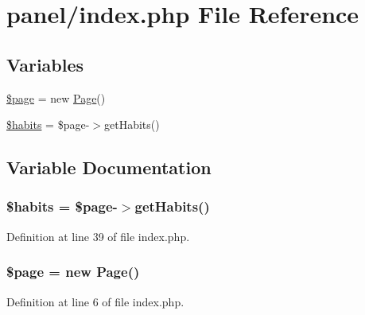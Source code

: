 \hypertarget{panel_2index_8php}{}\section{panel/index.php File Reference}
\label{panel_2index_8php}
\subsection*{Variables}
\begin{DoxyCompactItemize}
\item 
\hyperlink{panel_2index_8php_a0a44e6760141442bb439b1ab1395d8ff}{\$page} = new \hyperlink{class_page}{Page}()
\item 
\hyperlink{panel_2index_8php_adb07f6e649a22461013fd4e2b45feee9}{\$habits} = \$page-\/$>$get\+Habits()
\end{DoxyCompactItemize}


\subsection{Variable Documentation}
\hypertarget{panel_2index_8php_adb07f6e649a22461013fd4e2b45feee9}{}
\subsubsection[{\$habits}]{\setlength{\rightskip}{0pt plus 5cm}\$habits = \$page-\/$>$get\+Habits()}\label{panel_2index_8php_adb07f6e649a22461013fd4e2b45feee9}


Definition at line 39 of file index.\+php.

\hypertarget{panel_2index_8php_a0a44e6760141442bb439b1ab1395d8ff}{}
\subsubsection[{\$page}]{\setlength{\rightskip}{0pt plus 5cm}\$page = new {\bf Page}()}\label{panel_2index_8php_a0a44e6760141442bb439b1ab1395d8ff}


Definition at line 6 of file index.\+php.

